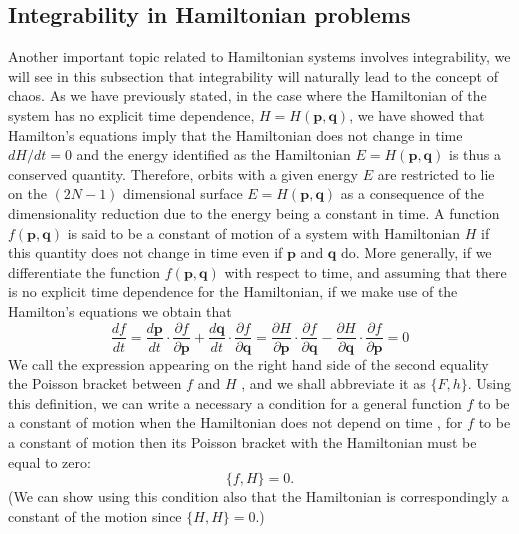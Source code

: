 \subsection{Integrability in Hamiltonian problems}
Another important topic related to Hamiltonian systems involves integrability, we will see in this subsection that integrability will naturally lead to the concept of chaos. As we have previously stated, in the case where the Hamiltonian of the system has no explicit time dependence, $H=H(\bm{p},\bm{q})$, we have showed that Hamilton's equations imply that the Hamiltonian does not change in time $dH/dt=0$ and the energy identified as the Hamiltonian $E=H(\bm{p},\bm{q})$ is thus a conserved quantity. Therefore, orbits with a given energy $E$ are restricted to lie on the $(2N-1)$ dimensional surface $E=H(\bm{p},\bm{q})$ as a consequence of the dimensionality reduction due to the energy being a constant in time. A function $f(\bm{p},\bm{q})$ is said to be a constant of motion of a system with Hamiltonian $H$ if this quantity does not change in time even if $\bm{p}$ and $\bm{q}$ do. More generally, if we differentiate the function $f(\bm{p},\bm{q})$ with respect to time, and assuming that there is no explicit time dependence for the Hamiltonian, if we make use of the Hamilton's equations we obtain that
\begin{equation}
\frac{df}{dt}=\frac{d\bm{p}}{dt}\cdot\frac{\partial f}{\partial \bm{p}}+\frac{d\bm{q}}{dt}\cdot\frac{\partial f}{\partial \bm{q}}= \frac{\partial H}{\partial \bm{p}}\cdot\frac{\partial f}{\partial \bm{q}}-\frac{\partial H}{\partial \bm{q}}\cdot\frac{\partial f}{\partial \bm{p}}=0
\end{equation}
We call the expression appearing on the right hand side of the second equality the Poisson bracket between  $f$ and $H$ \cite{goldstein2002classical}, and we shall abbreviate it as $\{F,h\}$. Using this definition, we can write a necessary a condition for a general function $f$ to be a constant of motion when the Hamiltonian does not depend on time \cite{zaslavsky2005hamiltonian}, for $f$ to be a constant of motion then its Poisson bracket with the Hamiltonian must be equal to zero:
\begin{equation}
\{ f,H\} =0.
\end{equation}
(We can show using this condition also that the Hamiltonian is correspondingly a constant of the motion since $\{H,H\}=0$.)\par

